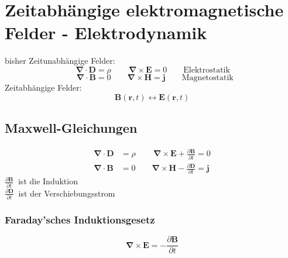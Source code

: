 \documentclass[titlepage,11pt,a4paper,ngerman]{report}
\newcommand{\tx}[1]{\textrm{#1}}
\newcommand{\prt}[2]{\frac{\partial #1}{\partial #2}}
\renewcommand{\vec}[1]{\boldsymbol{#1}}
\newcommand{\vabla}{\boldsymbol{\nabla}}
\begin{document}



\chapter{Zeitabhängige elektromagnetische Felder - Elektrodynamik}

bisher Zeitunabhängige Felder:
\begin{equation*}
\, \vabla \cdot \vec{D} = \rho \qquad \, \vabla \times \vec{E} = 0 \qquad \tx{Elektrostatik}
\end{equation*}
\begin{equation*}
\ \ \: \vabla \cdot \vec{B} = 0 \qquad \vabla \times \vec{H} = \vec{j} \qquad \tx{Magnetostatik}
\end{equation*}
Zeitabhängige Felder:
\begin{equation*}
\vec{B}(\vec{r}, t) \leftrightarrow \vec{E}(\vec{r}, t)
\end{equation*}

\section{Maxwell-Gleichungen}

\begin{align*}
\vabla \cdot \vec{D} &= \rho \qquad \, \vabla \times \vec{E} + \prt{\vec{B}}{t} = 0 \\
\vabla \cdot \vec{B} &= 0 \qquad \vabla \times \vec{H} - \prt{\vec{D}}{t} = \vec{j}
\end{align*}
$ \prt{\vec{B}}{t} \ $ ist die Induktion\\[3pt]
$ \prt{\vec{D}}{t} \ $ ist der Verschiebungsstrom\\

\subsection{Faraday'sches Induktionsgesetz}

\begin{equation*}
\vabla \times \vec{E} = - \prt{\vec{B}}{t}
\end{equation*}

\end{document}
